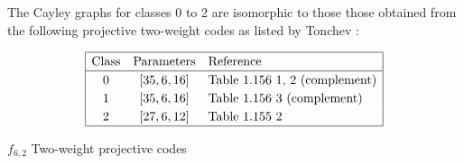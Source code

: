 \documentclass[12pt,a4paper]{article}
\begin{document}
The Cayley graphs for classes 0 to 2 are isomorphic to those those obtained from the following
projective two-weight
codes as listed by Tonchev \cite{Ton07codes}:

\begin{table}[!bhpt] %
\begin{align*}
\def\arraystretch{1.2}
\begin{array}{|ccl|}
\hline
\text{Class} &
\text{Parameters} & \text{Reference}
\\
\hline
0 & [35,6,16] & \text{Table 1.156 1, 2 (complement)}
\\
1 & [35,6,16] & \text{Table 1.156 3 (complement)}
\\
2 & [27,6,12] & \text{Table 1.155 2 }
\\
\hline
\end{array}
\end{align*}
\caption{$f_{6,2}$ Two-weight projective codes}
\label{tab-c6_2_codes}
\end{table}
\end{document}

